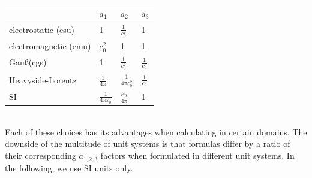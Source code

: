 \documentclass[12pt,a4paper,twoside,openright,BCOR10mm,headsepline,titlepage,abstracton,chapterprefix,final]{scrreprt}
\newcommand\vacuum{0}
\newcommand\vacuumpermeability{\scalarpermeability_{\vacuum}}
\newcommand\scalarpermeability{\mu}
\newcommand\vacuumpermittivity{\scalarpermittivity_{\vacuum}}
\newcommand\scalarpermittivity{\varepsilon}
\begin{document}
\begin{tabular}{l|lll}
                       & $a_1$\qquad\qquad                    & $a_2$\qquad\qquad                  & $a_3$ \\
 \hline
 electrostatic (esu)   & 1                                    & $\frac{1}{c_0^2}$                  & 1 \\
 electromagnetic (emu) & $c_0^2$                              & 1                                  & 1 \\
 Gau\ss (cgs)          & 1                                    & $\frac{1}{c_0^2}$                  & $\frac{1}{c_0}$ \\
 Heavyside-Lorentz     & $\frac{1}{4\pi}$                     & $\frac{1}{4\pi c_0^2}$             & $\frac{1}{c_0}$ \\
 SI                    & $\frac{1}{4\pi \vacuumpermittivity}$ & $\frac{\vacuumpermeability}{4\pi}$ & 1 
\end{tabular}\\[2ex]

Each of these choices has its advantages when calculating in certain domains.
The downside of the multitude of unit systems is that formulas differ by 
a ratio of their corresponding $a_{1,2,3}$ factors when formulated in different unit systems.
In the following, we use SI units only.
\end{document}

